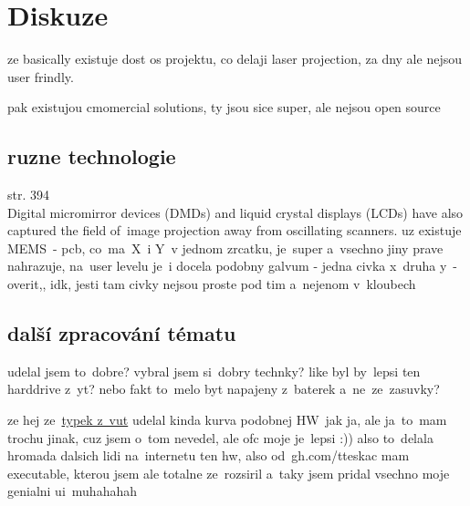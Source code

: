 \chapter{Diskuze}

ze basically existuje dost os projektu, co delaji laser projection, za dny ale nejsou user frindly.

pak existujou cmomercial solutions, ty jsou sice super, ale nejsou open source

\section{ruzne technologie}
\cite{scanning-handbook} str. 394 \\
Digital micromirror devices (DMDs) and
liquid crystal displays (LCDs) have also captured the field of~image projection away from
oscillating scanners.
uz existuje MEMS~\cite{mems-review}- pcb, co~ma~X~i Y~v jednom zrcatku, je~super a~vsechno jiny prave nahrazuje, na~user levelu je~i docela podobny galvum - jedna civka x~druha y~- overit,, idk, jesti tam civky nejsou proste pod tim a~nejenom v~kloubech



\section{další zpracování tématu}
udelal jsem to~dobre? vybral jsem si~dobry technky?
like byl by~lepsi ten harddrive z~yt?
nebo fakt to~melo byt napajeny z~baterek a~ne~ze~zasuvky?

ze hej ze~\href{https://dspace.vutbr.cz/bitstream/handle/11012/38621/final-thesis.pdf?sequence=-1}{typek z~vut} udelal kinda kurva podobnej HW~jak ja, ale ja~to~mam trochu jinak, cuz jsem o~tom nevedel, ale ofc moje je~lepsi :))
also to~delala hromada dalsich lidi na~internetu ten hw, also od~gh.com/tteskac mam executable, kterou jsem ale totalne ze~rozsiril a~taky jsem pridal vsechno moje genialni ui~muhahahah

